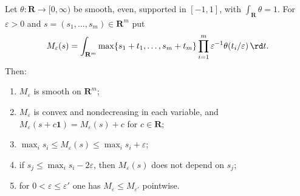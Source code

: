\begin{lemma}
\label{lem:ch15-regmax}
Let $\theta:\mathbf R\to[0,\infty)$ be smooth, even, supported in $[-1,1]$,
with $\int_{\mathbf R}\theta=1$.  For $\varepsilon>0$ and
$s=(s_1,\dots,s_m)\in\mathbf R^m$ put
\[
 M_\varepsilon(s)
 =\int_{\mathbf R^m}\max\{s_1+t_1,\dots,s_m+t_m\}
     \prod_{i=1}^m\varepsilon^{-1}\theta(t_i/\varepsilon)\,\rd t .
\]
Then:
\begin{enumerate}
\item\label{itm:ch15-regmax-smooth} $M_\varepsilon$ is smooth on
  $\mathbf R^m$;
\item\label{itm:ch15-regmax-convex} $M_\varepsilon$ is convex and
  nondecreasing in each variable, and
  $M_\varepsilon(s+c\mathbf 1)=M_\varepsilon(s)+c$ for $c\in\mathbf R$;
\item\label{itm:ch15-regmax-sandwich}
  $\max_is_i\le M_\varepsilon(s)\le\max_is_i+\varepsilon$;
\item\label{itm:ch15-regmax-trunc} if $s_j\le\max_is_i-2\varepsilon$, then
  $M_\varepsilon(s)$ does not depend on $s_j$;
\item\label{itm:ch15-regmax-mono} for $0<\varepsilon\le\varepsilon'$ one has
  $M_\varepsilon\le M_{\varepsilon'}$ pointwise.
\end{enumerate}
\end{lemma}

